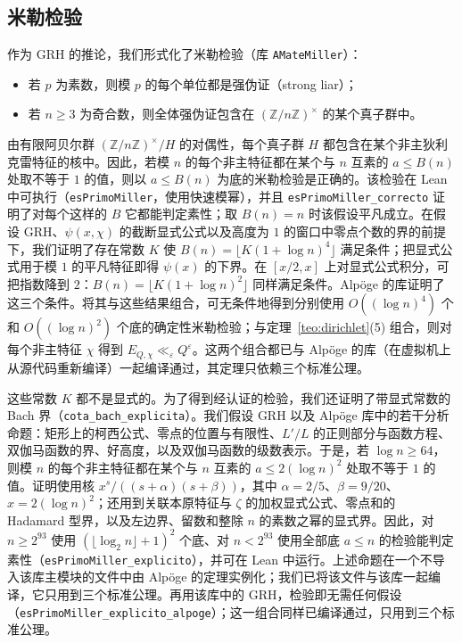 \documentclass[11pt,a4paper]{amsart}
\theoremstyle{definition}
\theoremstyle{remark}
\begin{document}
\subsection*{米勒检验}
作为 GRH 的推论，我们形式化了米勒检验（库 \texttt{AMateMiller}）：
\begin{itemize}
\item 若 $p$ 为素数，则模 $p$ 的每个单位都是强伪证（strong liar）；
\item 若 $n\ge3$ 为奇合数，则全体强伪证包含在 $(\mathbb Z/n\mathbb Z)^\times$ 的某个真子群中。
\end{itemize}
由有限阿贝尔群 $(\mathbb Z/n\mathbb Z)^\times/H$ 的对偶性，每个真子群 $H$ 都包含在某个非主狄利克雷特征的核中。因此，若模 $n$ 的每个非主特征都在某个与 $n$ 互素的 $a\le B(n)$ 处取不等于 $1$ 的值，则以 $a\le B(n)$ 为底的米勒检验是正确的。该检验在 Lean 中可执行（\texttt{esPrimoMiller}，使用快速模幂），并且 \texttt{esPrimoMiller\_correcto} 证明了对每个这样的 $B$ 它都能判定素性；取 $B(n)=n$ 时该假设平凡成立。在假设 GRH、$\psi(x,\chi)$ 的截断显式公式以及高度为 $1$ 的窗口中零点个数的界的前提下，我们证明了存在常数 $K$ 使 $B(n)=\lfloor K(1+\log n)^4\rfloor$ 满足条件；把显式公式用于模 $1$ 的平凡特征即得 $\psi(x)$ 的下界。在 $[x/2,x]$ 上对显式公式积分，可把指数降到 $2$：$B(n)=\lfloor K(1+\log n)^2\rfloor$ 同样满足条件。Alp\"oge 的库证明了这三个条件。将其与这些结果组合，可无条件地得到分别使用 $O((\log n)^4)$ 个和 $O((\log n)^2)$ 个底的确定性米勒检验；与定理~\ref{teo:dirichlet}(5) 组合，则对每个非主特征 $\chi$ 得到 $E_{Q,\chi}\ll_\varepsilon Q^\varepsilon$。这两个组合都已与 Alp\"oge 的库（在虚拟机上从源代码重新编译）一起编译通过，其定理只依赖三个标准公理。

这些常数 $K$ 都不是显式的。为了得到经认证的检验，我们还证明了带显式常数的 Bach 界（\texttt{cota\_bach\_explicita}）。我们假设 GRH 以及 Alp\"oge 库中的若干分析命题：矩形上的柯西公式、零点的位置与有限性、$L'/L$ 的正则部分与函数方程、双伽马函数的界、好高度，以及双伽马函数的级数表示。于是，若 $\log n\ge 64$，则模 $n$ 的每个非主特征都在某个与 $n$ 互素的 $a\le 2(\log n)^2$ 处取不等于 $1$ 的值。证明使用核 $x^s/((s+\alpha)(s+\beta))$，其中 $\alpha=2/5$、$\beta=9/20$、$x=2(\log n)^2$；还用到关联本原特征与 $\zeta$ 的加权显式公式、零点和的 Hadamard 型界，以及左边界、留数和整除 $n$ 的素数之幂的显式界。因此，对 $n\ge 2^{93}$ 使用 $(\lfloor\log_2 n\rfloor+1)^2$ 个底、对 $n<2^{93}$ 使用全部底 $a\le n$ 的检验能判定素性（\texttt{esPrimoMiller\_explicito}），并可在 Lean 中运行。上述命题在一个不导入该库主模块的文件中由 Alp\"oge 的定理实例化；我们已将该文件与该库一起编译，它只用到三个标准公理。再用该库中的 GRH，检验即无需任何假设（\texttt{esPrimoMiller\_explicito\_alpoge}）；这一组合同样已编译通过，只用到三个标准公理。
\end{document}
